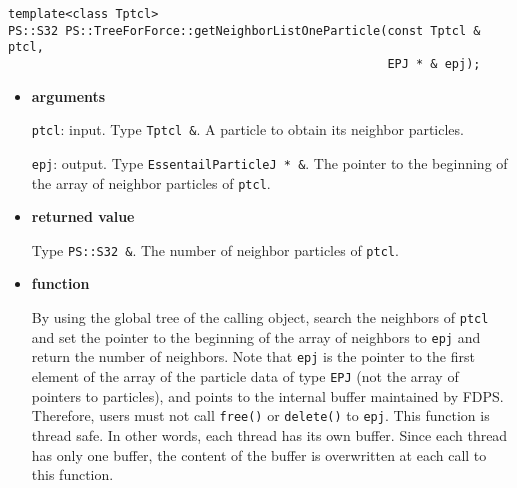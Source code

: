 \label{sec:neighborlist}


\begin{screen}
\begin{verbatim}
template<class Tptcl>
PS::S32 PS::TreeForForce::getNeighborListOneParticle(const Tptcl & ptcl, 
                                                     EPJ * & epj);
\end{verbatim}
\end{screen}

\begin{itemize}

\item {\bf arguments}

{\tt ptcl}: input. Type {\tt Tptcl \&}. A particle to obtain its neighbor particles.


{\tt epj}: output. Type {\tt EssentailParticleJ * \&}. The
pointer to the beginning of the array of neighbor particles of
{\tt ptcl}.

\item {\bf returned value}

Type {\tt PS::S32 \&}. The number of neighbor particles of {\tt ptcl}.

\item {\bf function}

By using the global tree of the calling object, search the neighbors of {\tt ptcl} and set the pointer to the beginning of the array of neighbors to {\tt epj} and return the number of neighbors. Note that \texttt{epj} is the pointer to the first element of the array of the particle data of type \texttt{EPJ} (not the array of pointers to particles), and points  to the internal buffer maintained by FDPS. Therefore,  users must not call {\tt free()} or {\tt delete()} to {\tt epj}. This function is thread safe. In other words, each thread has its own buffer. Since each thread has only one buffer, the content of the buffer is overwritten at each call to this function. 



\end{itemize}
